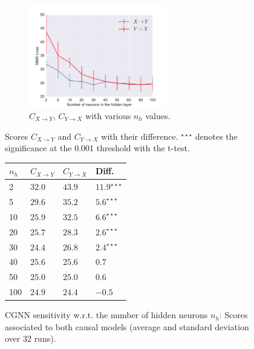 \documentclass[a4paper, 11pt]{article}
\begin{document}
\begin{figure}[!h]
       \begin{subfigure}{0.59\textwidth}
       \centering
       \includegraphics[width=6cm]{parallelogram_curve.pdf}
       \caption{$C_{X\rightarrow Y}$, $C_{Y\rightarrow X}$ with various $n_h$ values.}
       \label{figure:parallelogramme-pareto}
   \end{subfigure}
   \begin{subtable}{0.39\textwidth}
         \footnotesize
         \caption{Scores  $C_{X\rightarrow Y}$ and $C_{Y\rightarrow X}$ with their difference. $^{\star \star \star }$ denotes the significance at the  0.001 threshold with the t-test.}
         \label{table:diff_scores_parallelogram}
           \begin{tabular}{llll}
           \toprule
            $n_h$ & $C_{X\rightarrow Y}$ & $C_{Y\rightarrow X}$ & Diff.\\
           \midrule
           2 & $32.0$ & $43.9$ & $11.9^{\star \star \star }$ \\
           5 & $29.6$ & $35.2$ & $5.6^{\star \star \star }$ \\
           10 & $25.9$ & $32.5$ & $6.6^{\star \star \star }$ \\
           20 & $25.7$ & $28.3$ & $2.6^{\star \star \star }$ \\
           30 & $24.4$ & $26.8$ & $2.4^{\star \star \star }$ \\
           40 &  $25.6$ & $25.6$ & $0.7$ \\
           50 &  $25.0$ & $25.0$ & $0.6$ \\
           100 & $24.9$ & $24.4$ & $-0.5$ \\
           \bottomrule
      \end{tabular} 
    \end{subtable}
    \caption{CGNN sensitivity w.r.t. the number of hidden neurons $n_h$: Scores associated to both causal models (average and standard deviation over 32 runs).}
\end{figure}
\end{document}
